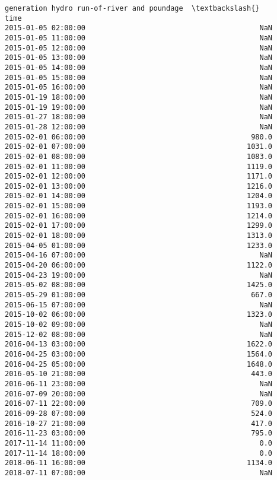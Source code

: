 \documentclass[11pt]{article}
\begin{document}
\begin{tcolorbox}[breakable, size=fbox, boxrule=.5pt, pad at break*=1mm, opacityfill=0]
\begin{Verbatim}[commandchars=\\\{\}]
                     generation hydro run-of-river and poundage  \textbackslash{}
time
2015-01-05 02:00:00                                         NaN
2015-01-05 11:00:00                                         NaN
2015-01-05 12:00:00                                         NaN
2015-01-05 13:00:00                                         NaN
2015-01-05 14:00:00                                         NaN
2015-01-05 15:00:00                                         NaN
2015-01-05 16:00:00                                         NaN
2015-01-19 18:00:00                                         NaN
2015-01-19 19:00:00                                         NaN
2015-01-27 18:00:00                                         NaN
2015-01-28 12:00:00                                         NaN
2015-02-01 06:00:00                                       980.0
2015-02-01 07:00:00                                      1031.0
2015-02-01 08:00:00                                      1083.0
2015-02-01 11:00:00                                      1119.0
2015-02-01 12:00:00                                      1171.0
2015-02-01 13:00:00                                      1216.0
2015-02-01 14:00:00                                      1204.0
2015-02-01 15:00:00                                      1193.0
2015-02-01 16:00:00                                      1214.0
2015-02-01 17:00:00                                      1299.0
2015-02-01 18:00:00                                      1313.0
2015-04-05 01:00:00                                      1233.0
2015-04-16 07:00:00                                         NaN
2015-04-20 06:00:00                                      1122.0
2015-04-23 19:00:00                                         NaN
2015-05-02 08:00:00                                      1425.0
2015-05-29 01:00:00                                       667.0
2015-06-15 07:00:00                                         NaN
2015-10-02 06:00:00                                      1323.0
2015-10-02 09:00:00                                         NaN
2015-12-02 08:00:00                                         NaN
2016-04-13 03:00:00                                      1622.0
2016-04-25 03:00:00                                      1564.0
2016-04-25 05:00:00                                      1648.0
2016-05-10 21:00:00                                       443.0
2016-06-11 23:00:00                                         NaN
2016-07-09 20:00:00                                         NaN
2016-07-11 22:00:00                                       709.0
2016-09-28 07:00:00                                       524.0
2016-10-27 21:00:00                                       417.0
2016-11-23 03:00:00                                       795.0
2017-11-14 11:00:00                                         0.0
2017-11-14 18:00:00                                         0.0
2018-06-11 16:00:00                                      1134.0
2018-07-11 07:00:00                                         NaN


\end{Verbatim}
\end{tcolorbox}
\end{document}
